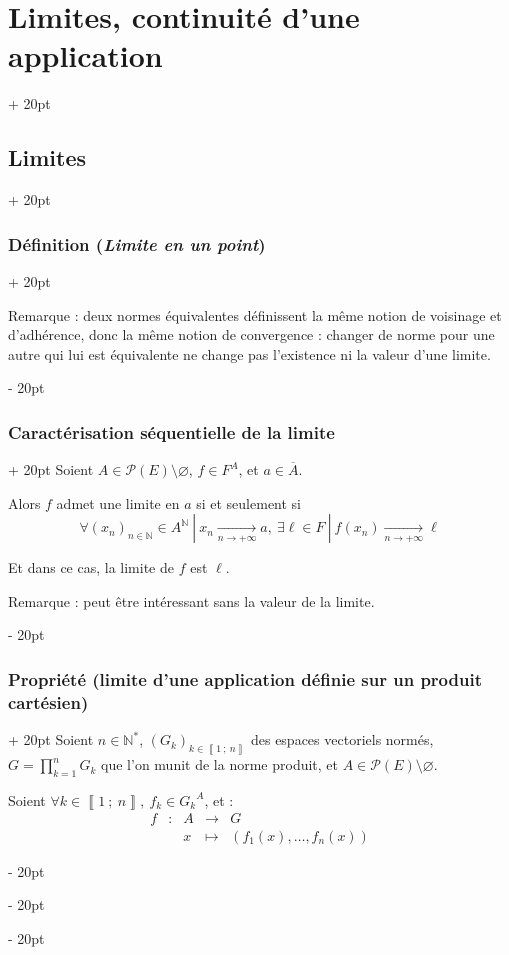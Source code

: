 \documentclass[a4paper, 12pt, twoside]{article}
\newcommand{\N}{\mathbb{N}} %
\newcommand{\nset}[2]{\left\llbracket #1\ ;\ #2 \right\rrbracket}
\newcommand{\cj}[1]{\overline{#1}} %
\newcommand{\tendsto}[1]{\xrightarrow[#1]{}}
\newcommand{\lr}[1]{\left( #1 \right)}
\newcommand{\ind}[1][20pt]{\advance\leftskip + #1}
\newcommand{\deind}[1][20pt]{\advance\leftskip - #1}
\newenvironment{indt}[2][20pt]{#2 \par \ind[#1]}{\par \deind} %
\begin{document}
\begin{indt}{\section{Limites, continuité d'une application}}
\begin{indt}{\subsection{Limites}}
\begin{indt}{\subsubsection{Définition (\textit{Limite en un point})}}
                \vspace{12pt}
                
                Remarque : deux normes équivalentes définissent la même notion de voisinage et d'adhérence, donc la même notion de convergence : changer de norme pour une autre qui lui est équivalente ne change pas l'existence ni la valeur d'une limite.
            \end{indt}

            \vspace{12pt}
            
            \begin{indt}{\subsubsection{Caractérisation séquentielle de la limite}}
                Soient $A \in \mathcal P(E) \setminus \varnothing$, $f \in F^A$, et $a \in \cj A$.

                Alors $f$ admet une limite en $a$ si et seulement si
                \[
                    \forall (x_n)_{n \in \N} \in A^\N\ |\ x_n \tendsto{n \to +\infty} a,\
                    \exists \ell \in F\ |\ f(x_n) \tendsto{n \to +\infty} \ell
                \]

                Et dans ce cas, la limite de $f$ est $\ell$.

                \vspace{12pt}
                
                Remarque : peut être intéressant sans la valeur de la limite.
            \end{indt}

            \vspace{12pt}
            
            \begin{indt}{\subsubsection{Propriété (limite d'une application définie sur un produit cartésien)}}
                Soient $n \in \N^*$, $(G_k)_{k \in \nset 1 n}$ des espaces vectoriels normés, $\displaystyle G = \prod_{k = 1}^n G_k$ que l'on munit de la norme produit, et $A \in \mathcal P(E) \setminus \varnothing$.

                Soient $\forall k \in \nset 1 n,\ f_k \in {G_k}^A$, et :
                \[
                    \begin{array}{ccccc}
                        f & : & A & \longrightarrow & G
                        \\
                          && x & \longmapsto & \lr{f_1(x), \ldots, f_n(x)}
                    \end{array}
                \]


\end{indt}
\end{indt}
\end{indt}
\end{document}
